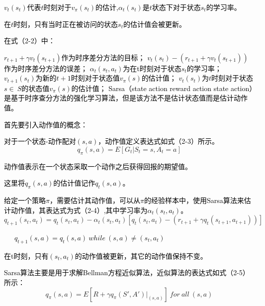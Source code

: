 \textcolor{black}{$v_{t}(s_{t})$代表$t$时刻对于$v_{\pi}(s_{t})$的估计,${\alpha_{t}(s_{t})}$是$t$状态下对于状态$s_{t}$的学习率。}

\textcolor{black}{在$t$时刻，只有当时正在被访问的状态$s_{t}$的估计值会被更新。}

\textcolor{black}{在式（2-2）中：}

\textcolor{black}{$r_{t+1}+\gamma v_{t}(s_{t+1})$作为时序差分方法的目标；}
\textcolor{black}{$v_{t}(s_{t})-(r_{t+1}+\gamma v_{t}(s_{t+1}))$作为时序差分方法的误差；}
\textcolor{black}{$\alpha_{t}(s_{t},a_{t})$为在{t}时刻对于状态$s_{t}$的学习率；}
\textcolor{black}{$v_{t+1}(s_{t})$为新的$t+1$时刻对于状态值$v_{\pi}(s)$的估计值；}
\textcolor{black}{$v_{t}(s_{t})$为$t$时刻对于状态$s\in\ S$的状态值$v_{\pi}(s)$的估计值；}
\textcolor{black}{Sarsa（state action reward action state action）是基于时序查分方法的强化学习算法，但是该方法不是估计状态值而是估计动作值\cite{ref29}\cite{ref30}。}

\textcolor{black}{首先要引入动作值的概念：}

\textcolor{black}{对于一个状态-动作配对${(s,a)}$，动作值定义表达式如式（2-3）所示。}
\begin{equation}
q_{\pi}\left({s,a}\right)={E}\left[\left.{G}_{t}\right|{S}_{t}{=s,} {A}_{t}{=a} \right] 
\end{equation}

\textcolor{black}{动作值表示在一个状态采取一个动作之后获得回报的期望值。}

\textcolor{black}{这里将${q}_{\pi}\left({s,a}\right)$的估计值记作${q}_{t}\left({s,a}\right)$。}

\textcolor{black}{给定一个策略$\pi$，需要估计其动作值，可以从$\pi$的经验样本中，使用Sarsa算法来估计动作值，其表达式为式（2-4）,其中学习率为$\alpha _{t}(s_{t},a_{t})$。}
\begin{equation}
q_{t+1}(s_{t},a_{t})=q_{t}(s_{t},a_{t})-\alpha _{t}(s_{t},a_{t})[q_{t}(s_{t},a_{t})-(r_{t+1}+\gamma q_{t}(s_{t+1},a_{t+1}))]    
\end{equation}

\textcolor{black}{\ \ \ $q_{t+1}(s,a)=q_{t}(s,a) \ while \ (s,a) \neq (s_{t},a_{t})$}

\textcolor{black}{在t时刻，只有$\left({s}_{t}{,} {a}_{t}\right)$的动作值被更新，其它的动作值保持不变。}

\textcolor{black}{Sarsa算法主要是用于求解Bellman方程近似算法，近似算法的表达式如式（2-5）所示：}
\begin{equation}
{q}_{\pi}({s,a}){=E}[R+\gamma q_{\pi}(S',A')|_{(s,a)}] \ for \ all \ (s,a) 
\end{equation}

